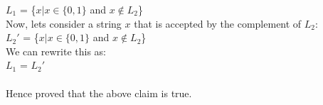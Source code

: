 \documentclass[a4paper]{exam}
\begin{document}
\begin{questions}
\begin{solution}
    $L_1$ = \{$x | x \in \{0,1\}$ and $x \notin L_2 $\} \\

    Now, lets consider a string $x$ that is accepted by the complement of $L_2$: \\
    $L_2'$ = \{$x | x \in \{0,1\}$ and $x \notin L_2 $\} \\ 

    We can rewrite this as:\\
    $L_1$ = $L_2'$
    \\
    \\ Hence proved that the above claim is true.
    

   
    
  \end{solution}
  
\end{questions}
\end{document}
